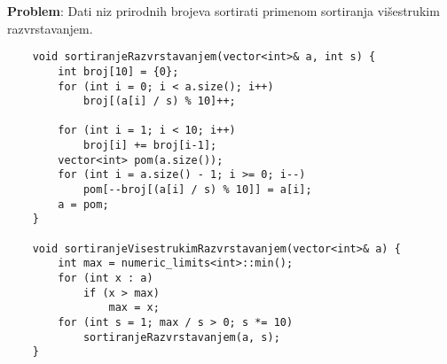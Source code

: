 \documentclass{article}
\begin{document}
\vspace{0.1cm}
\textbf{Problem}: Dati niz prirodnih brojeva sortirati primenom sortiranja višestrukim razvrstavanjem.
\begin{lstlisting}
    void sortiranjeRazvrstavanjem(vector<int>& a, int s) {
        int broj[10] = {0};
        for (int i = 0; i < a.size(); i++)
            broj[(a[i] / s) % 10]++;
            
        for (int i = 1; i < 10; i++)
            broj[i] += broj[i-1];
        vector<int> pom(a.size());
        for (int i = a.size() - 1; i >= 0; i--)
            pom[--broj[(a[i] / s) % 10]] = a[i];
        a = pom;
    }

    void sortiranjeVisestrukimRazvrstavanjem(vector<int>& a) {
        int max = numeric_limits<int>::min();
        for (int x : a)
            if (x > max)
                max = x;
        for (int s = 1; max / s > 0; s *= 10)
            sortiranjeRazvrstavanjem(a, s);
    }
\end{lstlisting}
\end{document}
